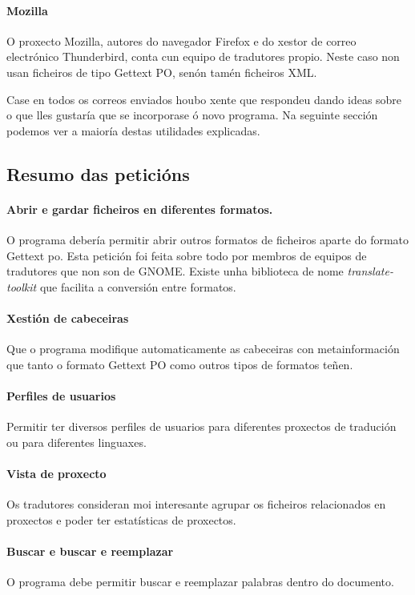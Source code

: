 \paragraph{Mozilla} O proxecto Mozilla, autores do navegador Firefox e do xestor de correo electrónico Thunderbird, conta cun equipo de tradutores propio. Neste caso non usan ficheiros de tipo Gettext PO, senón tamén ficheiros XML.

Case en todos os correos enviados houbo xente que respondeu dando ideas sobre o que lles gustaría que se incorporase ó novo programa. Na seguinte sección podemos ver a maioría destas utilidades explicadas.

\subsection{Resumo das peticións}
	\paragraph{Abrir e gardar ficheiros en diferentes formatos.} O programa debería permitir abrir outros formatos de ficheiros aparte do formato Gettext po. Esta petición foi feita sobre todo por membros de equipos de tradutores que non son de GNOME. Existe unha biblioteca de nome \emph{translate-toolkit} que facilita a conversión entre formatos.

	\paragraph{Xestión de cabeceiras} Que o programa modifique automaticamente as cabeceiras con metainformación que tanto o formato Gettext PO como outros tipos de formatos teñen.

	\paragraph{Perfiles de usuarios} Permitir ter diversos perfiles de usuarios para diferentes proxectos de tradución ou para diferentes linguaxes.

	\paragraph{Vista de proxecto} Os tradutores consideran moi interesante agrupar os ficheiros relacionados en proxectos e poder ter estatísticas de proxectos.

	\paragraph{Buscar e buscar e reemplazar} O programa debe permitir buscar e reemplazar palabras dentro do documento.

